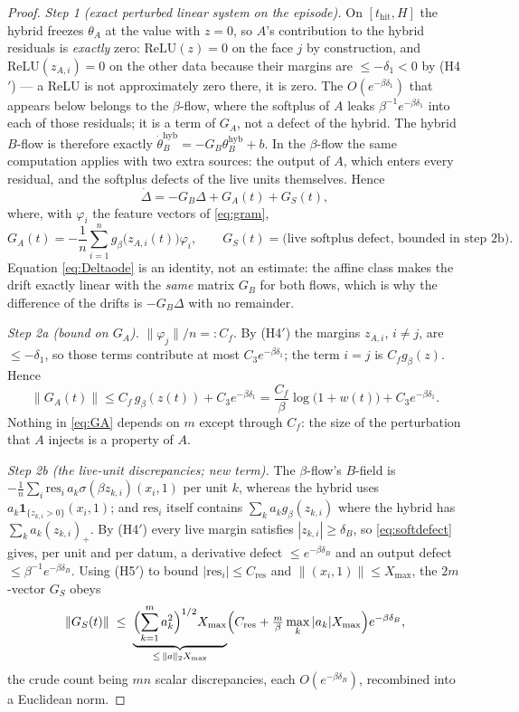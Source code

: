\documentclass[11pt]{article}
\theoremstyle{definition}
\theoremstyle{remark}
\newcommand{\hyb}{\mathrm{hyb}}
\newcommand{\thit}{t_{\mathrm{hit}}}
\newcommand{\res}{\mathrm{res}}
\begin{document}
\begin{proof}
\emph{Step 1 (exact perturbed linear system on the episode).} On $[\thit,H]$ the
hybrid freezes $\theta_A$ at the value with $z=0$, so $A$'s contribution to the
hybrid residuals is \emph{exactly} zero: $\mathrm{ReLU}(z)=0$ on the face $j$ by
construction, and $\mathrm{ReLU}(z_{A,i})=0$ on the other data because their
margins are $\le-\delta_1<0$ by (H4$'$) --- a ReLU is not approximately zero
there, it is zero. The $O(e^{-\beta\delta_1})$ that appears below belongs to the
$\beta$-flow, where the softplus of $A$ leaks $\beta^{-1}e^{-\beta\delta_1}$ into
each of those residuals; it is a term of $G_A$, not a defect of the hybrid. The
hybrid $B$-flow is therefore exactly
$\dot\theta_B^{\hyb}=-G_B\theta_B^{\hyb}+b$. In the $\beta$-flow the same
computation applies with two extra sources: the output of $A$, which enters every
residual, and the softplus defects of the live units themselves. Hence
\begin{equation}\label{eq:Deltaode}
\dot\Delta=-G_B\Delta+G_A(t)+G_S(t),
\end{equation}
where, with $\varphi_i$ the feature vectors of \eqref{eq:gram},
\[
G_A(t)=-\frac1n\sum_{i=1}^n g_\beta\bigl(z_{A,i}(t)\bigr)\varphi_i,
\qquad
G_S(t)=\text{(live softplus defect, bounded in step 2b).}
\]
Equation \eqref{eq:Deltaode} is an identity, not an estimate: the affine class
makes the drift exactly linear with the \emph{same} matrix $G_B$ for both flows,
which is why the difference of the drifts is $-G_B\Delta$ with no remainder.

\emph{Step 2a (bound on $G_A$).} $\|\varphi_j\|/n=:C_f$. By (H4$'$) the margins
$z_{A,i}$, $i\ne j$, are $\le-\delta_1$, so those terms contribute at most
$C_3e^{-\beta\delta_1}$; the term $i=j$ is $C_fg_\beta(z)$. Hence
\begin{equation}\label{eq:GA}
\|G_A(t)\|\le C_f\,g_\beta(z(t))+C_3e^{-\beta\delta_1}
=\frac{C_f}{\beta}\log\bigl(1+w(t)\bigr)+C_3e^{-\beta\delta_1}.
\end{equation}
Nothing in \eqref{eq:GA} depends on $m$ except through $C_f$: the size of the
perturbation that $A$ injects is a property of $A$.

\emph{Step 2b (the live-unit discrepancies; new term).} The $\beta$-flow's
$B$-field is
$-\tfrac1n\sum_i\res_i\,a_k\sigma(\beta z_{k,i})(x_i,1)$ per unit $k$, whereas
the hybrid uses $a_k\mathbf 1_{\{z_{k,i}>0\}}(x_i,1)$; and $\res_i$ itself
contains $\sum_ka_kg_\beta(z_{k,i})$ where the hybrid has
$\sum_ka_k(z_{k,i})_+$. By (H4$'$) every live margin satisfies
$|z_{k,i}|\ge\delta_B$, so \eqref{eq:softdefect} gives, per unit and per datum,
a derivative defect $\le e^{-\beta\delta_B}$ and an output defect
$\le\beta^{-1}e^{-\beta\delta_B}$. Using (H5$'$) to bound $|\res_i|\le
C_{\mathrm{res}}$ and $\|(x_i,1)\|\le X_{\max}$, the $2m$-vector $G_S$ obeys
\begin{equation}\label{eq:GS}
\|G_S(t)\|\;\le\;
\underbrace{\Bigl(\sum_{k=1}^m a_k^2\Bigr)^{1/2}X_{\max}}_{\le\,\|a\|_2X_{\max}}
\Bigl(C_{\mathrm{res}}+\tfrac{m}{\beta}\max_k|a_k|X_{\max}\Bigr)e^{-\beta\delta_B},
\end{equation}
the crude count being $mn$ scalar discrepancies, each $O(e^{-\beta\delta_B})$,
recombined into a Euclidean norm.


\end{proof}
\end{document}
